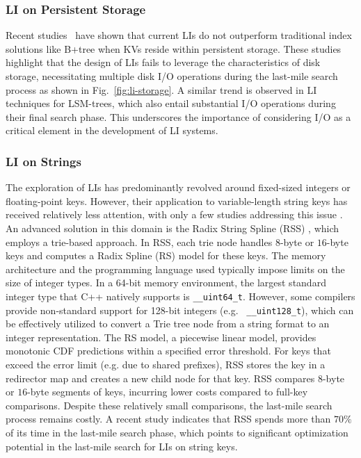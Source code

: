\vspace{3pt}
\noindent
\subsubsection{\textbf{LI on Persistent Storage}}

Recent studies~\cite{lidisk2024sigmod, wipe22024, apex2021, liDisk2024} have shown that current LIs do not outperform traditional index solutions like B+tree when KVs reside within persistent storage. These studies highlight that the design of LIs fails to leverage the characteristics of disk storage, necessitating multiple disk I/O operations during the last-mile search process as shown in Fig.~\ref{fig:li-storage}. A similar trend is observed in LI techniques for LSM-trees, which also entail substantial I/O operations during their final search phase. This underscores the importance of considering I/O as a critical element in the development of LI systems.

\vspace{3pt}
\noindent
\subsubsection{\textbf{LI on Strings}}
\label{sec:li-on-strings}
The exploration of LIs has predominantly revolved around fixed-sized integers or floating-point keys. However, their application to variable-length string keys has received relatively less attention, with only a few studies addressing this issue \cite{rss, wang2020sindex, lits2024vldb}. An advanced solution in this domain is the Radix String Spline (RSS) \cite{rss}, which employs a trie-based approach. In RSS, each trie node handles $8$-byte or $16$-byte keys and computes a Radix Spline (RS) model \cite{kipf2020radixspline} for these keys. The memory architecture and the programming language used typically impose limits on the size of integer types. In a 64-bit memory environment, the largest standard integer type that C++ natively supports is \texttt{\_\_uint64\_t}. However, some compilers provide non-standard support for 128-bit integers (e.g. \texttt{ \_\_uint128\_t}), which can be effectively utilized to convert a Trie tree node from a string format to an integer representation. The RS model, a piecewise linear model, provides monotonic CDF predictions within a specified error threshold. For keys that exceed the error limit (e.g. due to shared prefixes), RSS stores the key in a redirector map and creates a new child node for that key. RSS compares $8$-byte or $16$-byte segments of keys, incurring lower costs compared to full-key comparisons. Despite these relatively small comparisons, the last-mile search process remains costly. A recent study \cite{lits2024vldb} indicates that RSS spends more than $70\%$ of its time in the last-mile search phase, which points to significant optimization potential in the last-mile search for LIs on string keys.


